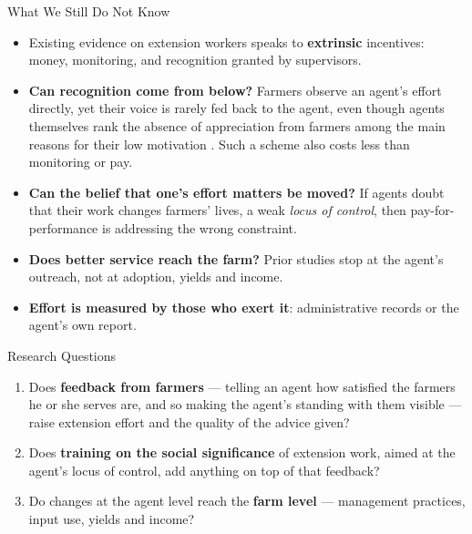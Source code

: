 \documentclass[aspectratio=169]{beamer}
\begin{document}
\begin{frame}{What We Still Do Not Know}
	\begin{itemize}\small
		\item Existing evidence on extension workers speaks to \textbf{extrinsic} incentives: money, monitoring, and recognition granted by supervisors.

		\vspace{0.18cm}
		\item \textbf{Can recognition come from below?} Farmers observe an agent's effort
		directly, yet their voice is rarely fed back to the agent, even though agents
		themselves rank the absence of appreciation
		from farmers among the main reasons for their low motivation \citep{Ragasa2013}. Such a scheme also costs less than monitoring or pay.

		\vspace{0.18cm}
		\item \textbf{Can the belief that one's effort matters be moved?} If agents doubt that
		their work changes farmers' lives, a weak \emph{locus of control}, then
		pay-for-performance is addressing the wrong constraint.

		\vspace{0.18cm}
		\item \textbf{Does better service reach the farm?} Prior studies stop at the agent's
		outreach, not at adoption, yields and income.

		\vspace{0.18cm}
		\item \textbf{Effort is measured by those who exert it}: administrative records or the
		agent's own report.
	\end{itemize}
\end{frame}

\begin{frame}{Research Questions}
	\begin{enumerate}
		\item Does \textbf{feedback from farmers} --- telling an agent how satisfied the farmers
		he or she serves are, and so making the agent's standing with them visible --- raise
		extension effort and the quality of the advice given?

		\vspace{0.35cm}
		\item Does \textbf{training on the social significance} of extension work, aimed at the
		agent's locus of control, add anything on top of that feedback?

		\vspace{0.35cm}
		\item Do changes at the agent level reach the \textbf{farm level} --- management
		practices, input use, yields and income?
	\end{enumerate}
\end{frame}
\end{document}
